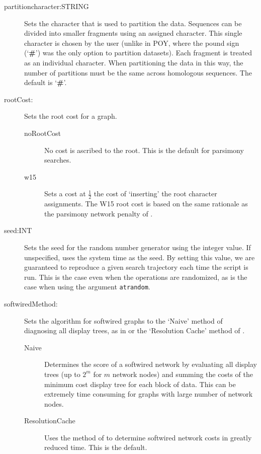 \begin{description}
		\item[partitioncharacter:STRING] Sets the character that is used to partition the 
		data. Sequences can be divided into smaller fragments using an assigned character. 
		This single character is chosen by the user (unlike in POY, where the pound sign 
		(`\textbf{\#}') was the only option to partition datasets). Each fragment is treated as an individual 
		character. When partitioning the data in this way, the number of partitions must be the 
		same across homologous sequences. The default is `\textbf{\#}'.
			
		\item[rootCost:] Sets the root cost for a graph. 			
			\begin{description}
			\item[noRootCost]  No cost is ascribed to the root.  This is the default for parsimony searches.
			
			\item[w15]  Sets a cost at $\frac{1}{2}$ the cost of `inserting' the root character 
			assignments. The W15 root cost is based on the same rationale as the parsimony 
			network penalty of  \cite{Wheeler2015}. 

			
			\end{description}
			 
		 \item[seed:INT] Sets the seed for the random number generator using the integer
		 value. If unspecified, \phyg uses the system time as the seed. By setting this value, 
		 we are guaranteed to reproduce a given search trajectory each time the script is run. 
		 This is the case even when the operations are randomized, as is the case when using 
		 the argument \texttt{atrandom}.
			 
		 \item[softwiredMethod:] Sets the algorithm for softwired graphs to the 
		 `Naive' method of diagnosing all display trees, as in \cite{Wheeler2015} or
		 the `Resolution Cache' method of \cite{WheelerandWashburn2023}.
		 
				
			\begin{description}
			\item[Naive] Determines the score of a softwired network by evaluating all display trees
			(up to $2^m$ for $m$ network nodes) and summing the costs of the minimum cost display tree for each block
			of data.  This can be extremely time consuming for graphs with large number of network nodes.
			
			\item[ResolutionCache] Uses the method of \citep{WheelerandWashburn2023} to determine
			softwired network costs in greatly reduced time.  This is the default.
			
			
			\end{description}
			
		\end{description}
					
